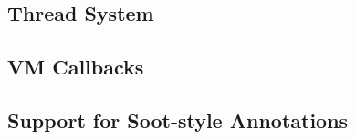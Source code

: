 \JavaTMFooter

\subsection{Thread System}\label{sec:threads}



\subsection{VM Callbacks}\label{sssec:callbacks}


\subsection{Support for Soot-style Annotations}\label{sssec:annotations}


